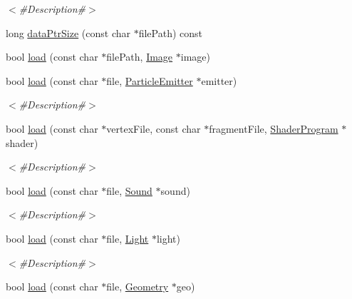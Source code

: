 \begin{DoxyCompactItemize}
\begin{DoxyCompactList}\small\item\em $<$\#\+Description\#$>$ \end{DoxyCompactList}\item 
long \mbox{\hyperlink{classnjli_1_1_world_resource_loader_a3f3751b55c4da00b6ec0fc6cad5cae9c}{data\+Ptr\+Size}} (const char $\ast$file\+Path) const
\item 
bool \mbox{\hyperlink{classnjli_1_1_world_resource_loader_ada8da80bfd97fbec5be2f0ba1efe0fa0}{load}} (const char $\ast$file\+Path, \mbox{\hyperlink{classnjli_1_1_image}{Image}} $\ast$image)
\item 
bool \mbox{\hyperlink{classnjli_1_1_world_resource_loader_aeeb978f3bd043a6647584f223776525c}{load}} (const char $\ast$file, \mbox{\hyperlink{classnjli_1_1_particle_emitter}{Particle\+Emitter}} $\ast$emitter)
\begin{DoxyCompactList}\small\item\em $<$\#\+Description\#$>$ \end{DoxyCompactList}\item 
bool \mbox{\hyperlink{classnjli_1_1_world_resource_loader_ac1a793a4a100afaf8a2a1e8c09809b06}{load}} (const char $\ast$vertex\+File, const char $\ast$fragment\+File, \mbox{\hyperlink{classnjli_1_1_shader_program}{Shader\+Program}} $\ast$shader)
\begin{DoxyCompactList}\small\item\em $<$\#\+Description\#$>$ \end{DoxyCompactList}\item 
bool \mbox{\hyperlink{classnjli_1_1_world_resource_loader_ae4ae9a2915ebddbabfd72cf927b0afee}{load}} (const char $\ast$file, \mbox{\hyperlink{classnjli_1_1_sound}{Sound}} $\ast$sound)
\begin{DoxyCompactList}\small\item\em $<$\#\+Description\#$>$ \end{DoxyCompactList}\item 
bool \mbox{\hyperlink{classnjli_1_1_world_resource_loader_a5e5f9156810ac9bad5e76a81868f29d8}{load}} (const char $\ast$file, \mbox{\hyperlink{classnjli_1_1_light}{Light}} $\ast$light)
\begin{DoxyCompactList}\small\item\em $<$\#\+Description\#$>$ \end{DoxyCompactList}\item 
bool \mbox{\hyperlink{classnjli_1_1_world_resource_loader_a9a65176315945a2201c160ca0df35edd}{load}} (const char $\ast$file, \mbox{\hyperlink{classnjli_1_1_geometry}{Geometry}} $\ast$geo)

\end{DoxyCompactItemize}
